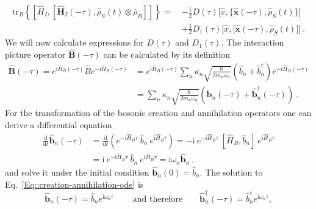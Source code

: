 	\begin{equation}
		\begin{split}
			\text{tr}_B \left\{  \left[{\hat{H}}_I, \left[{\boldsymbol{\hat{H}}}_I(- \tau), {\hat{\rho}}_S(t) \otimes \overline{\rho}_B \right]\right]  \right\} =	~&-\frac{\mathrm{i}}{2} D(\tau) \Big[\hat{x}, \big\{\boldsymbol{\hat{x}}(-\tau),  \hat{\rho}_S(t)\big\}\Big] \\
			&+ \frac{1}{2} D_1(\tau) \Big[\hat{x}, \big[\boldsymbol{\hat{x}}(-\tau),  \hat{\rho}_S(t)\big] \Big]~.
		\end{split}
	\end{equation}
	We will now calculate expressions for $D(\tau)$ and $D_1(\tau)$. The interaction picture operator $\boldsymbol{\hat{B}}(-\tau)$ can be calculated by its definition
	\begin{equation}
		\begin{split}
			\boldsymbol{\hat{B}}(-\tau) =	e^{\mathrm{i} \hat{H}_B (-\tau)} \hat{B} e^{- \mathrm{i} \hat{H}_B (-\tau)} &=	 e^{\mathrm{i} \hat{H}_B (-\tau)} \sum_n \kappa_n \sqrt{\frac{\hbar}{2 m_n \omega_n}} \left(\hat{b}_n + \hat{b}_n^\dagger\right) e^{- \mathrm{i} \hat{H}_B (-\tau)} \\
			&=	\sum_n \kappa_n \sqrt{\frac{\hbar}{2 m_n \omega_n}} \left(\boldsymbol{\hat{b}}_n(-\tau) + \boldsymbol{\hat{b}}_n^\dagger(-\tau) \right)~.
		\end{split}
	\end{equation}
	For the transformation of the bosonic creation and annihilation operators one can derive a differential equation
	\begin{equation} \label{Eq::creation-annihilation-ode}
		\begin{split}
			\frac{\text{d}}{\text{d}t} \boldsymbol{\hat{b}}_n(-\tau) &=	\frac{\text{d}}{\text{d}t} \left(e^{- \mathrm{i} \hat{H}_B \tau}~ \hat{b}_n~e^{ \mathrm{i} \hat{H}_B \tau}\right) = -\mathrm{i}~e^{- \mathrm{i} \hat{H}_B \tau}~ \left[\hat{H}_B, \hat{b}_n\right]~e^{\mathrm{i} \hat{H}_B \tau} \\
			&=	\mathrm{i}~e^{- \mathrm{i} \hat{H}_B \tau}~ \hat{b}_n~e^{\mathrm{i} \hat{H}_B \tau}  =	\mathrm{i}\omega_n \boldsymbol{\hat{b}}_n~,
		\end{split}
	\end{equation}
	and solve it under the initial condition $\boldsymbol{\hat{b}}_n(0) = \hat{b}_n	$. The solution to Eq.~\eqref{Eq::creation-annihilation-ode} is
	\begin{equation}
		\boldsymbol{\hat{b}}_n(-\tau) = \hat{b}_n e^{\mathrm{i}\omega_n \tau}~ \qquad \text{and therefore} \qquad \boldsymbol{\hat{b}}^{\dagger}_n(-\tau) = \hat{b}_n^\dagger e^{\mathrm{i}\omega_n \tau},
	\end{equation}
